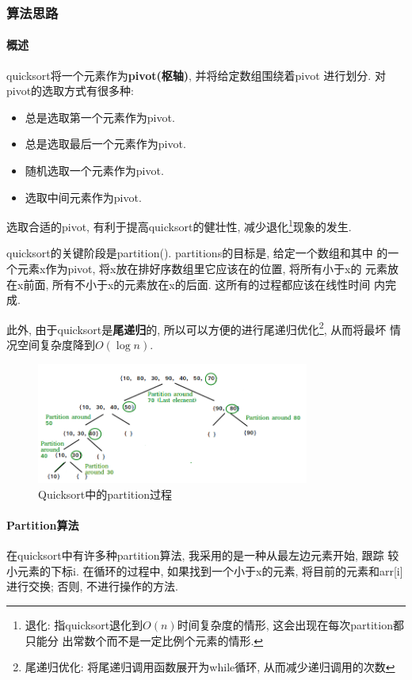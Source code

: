 \subsubsection{算法思路}
\label{sec:quicksortThink}
\paragraph{概述}
quicksort将一个元素作为\textbf{pivot(枢轴)}, 并将给定数组围绕着pivot
进行划分. 对pivot的选取方式有很多种:
\begin{itemize}
	\item 总是选取第一个元素作为pivot.
	\item 总是选取最后一个元素作为pivot.
	\item 随机选取一个元素作为pivot.
	\item 选取中间元素作为pivot.
\end{itemize}
选取合适的pivot, 有利于提高quicksort的健壮性, 减少退化\footnote{退化:
	指quicksort退化到$O(n)$时间复杂度的情形, 这会出现在每次partition都只能分
	出常数个而不是一定比例个元素的情形.}现象的发生.\par
quicksort的关键阶段是partition(). partitions的目标是, 给定一个数组和其中
的一个元素x作为pivot, 将x放在排好序数组里它应该在的位置, 将所有小于x的
元素放在x前面, 所有不小于x的元素放在x的后面. 这所有的过程都应该在线性时间
内完成. \par
此外, 由于quicksort是\textbf{尾递归}的, 所以可以方便的进行尾递归优化\footnote{
	尾递归优化: 将尾递归调用函数展开为while循环, 从而减少递归调用的次数}, 从而将最坏
情况空间复杂度降到$O(\log{n})$.
\begin{figure}[h!]
	\centering
	\includegraphics[width=0.8\textwidth]{figures/QuickSort2.png}
	\caption{Quicksort中的partition过程}
\end{figure}
\paragraph{Partition算法}
在quicksort中有许多种partition算法, 我采用的是一种从最左边元素开始, 跟踪
较小元素的下标i. 在循环的过程中, 如果找到一个小于x的元素,
将目前的元素和arr[i]进行交换; 否则, 不进行操作的方法.

